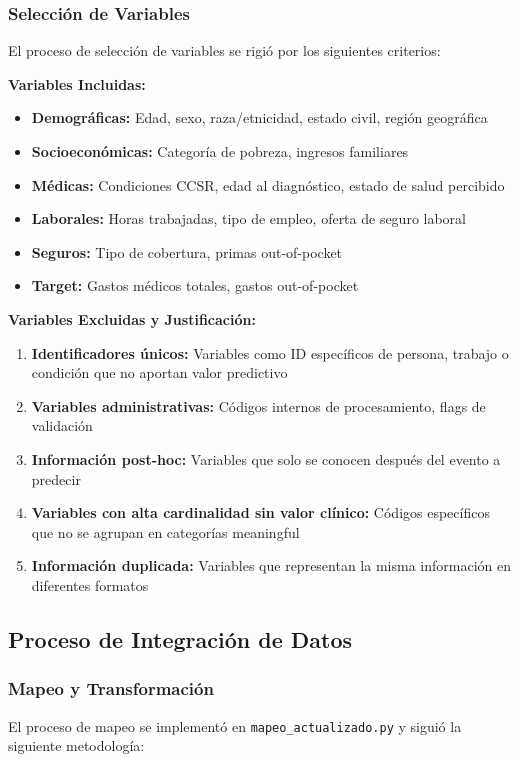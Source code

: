 \documentclass[12pt,a4paper]{article}
\begin{document}
\subsubsection{Selección de Variables}
El proceso de selección de variables se rigió por los siguientes criterios:

\textbf{Variables Incluidas:}
\begin{itemize}
    \item \textbf{Demográficas:} Edad, sexo, raza/etnicidad, estado civil, región geográfica
    \item \textbf{Socioeconómicas:} Categoría de pobreza, ingresos familiares
    \item \textbf{Médicas:} Condiciones CCSR, edad al diagnóstico, estado de salud percibido
    \item \textbf{Laborales:} Horas trabajadas, tipo de empleo, oferta de seguro laboral
    \item \textbf{Seguros:} Tipo de cobertura, primas out-of-pocket
    \item \textbf{Target:} Gastos médicos totales, gastos out-of-pocket
\end{itemize}

\textbf{Variables Excluidas y Justificación:}
\begin{enumerate}
    \item \textbf{Identificadores únicos:} Variables como ID específicos de persona, trabajo o condición que no aportan valor predictivo
    \item \textbf{Variables administrativas:} Códigos internos de procesamiento, flags de validación
    \item \textbf{Información post-hoc:} Variables que solo se conocen después del evento a predecir
    \item \textbf{Variables con alta cardinalidad sin valor clínico:} Códigos específicos que no se agrupan en categorías meaningful
    \item \textbf{Información duplicada:} Variables que representan la misma información en diferentes formatos
\end{enumerate}

\subsection{Proceso de Integración de Datos}

\subsubsection{Mapeo y Transformación}
El proceso de mapeo se implementó en \texttt{mapeo\_actualizado.py} y siguió la siguiente metodología:
\end{document}

